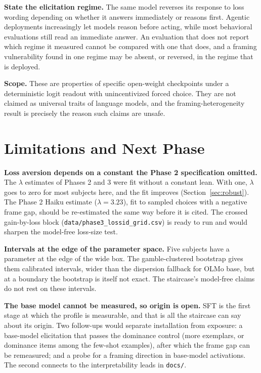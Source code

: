 \documentclass[11pt]{article}
\begin{document}
\textbf{State the elicitation regime.} The same model reverses its response to loss wording depending on
whether it answers immediately or reasons first. Agentic deployments increasingly let models reason
before acting, while most behavioral evaluations still read an immediate answer. An evaluation that does
not report which regime it measured cannot be compared with one that does, and a framing vulnerability
found in one regime may be absent, or reversed, in the regime that is deployed.

\textbf{Scope.} These are properties of specific open-weight checkpoints under a deterministic logit
readout with unincentivized forced choice. They are not claimed as universal traits of language models,
and the framing-heterogeneity result is precisely the reason such claims are unsafe.

\section{Limitations and Next Phase}

\textbf{Loss aversion depends on a constant the Phase 2 specification omitted.} The $\lambda$ estimates
of Phases 2 and 3 were fit without a constant lean. With one, $\lambda$ goes to zero for most subjects
here, and the fit improves (Section~\ref{sec:robust}). The Phase 2 Haiku estimate ($\lambda = 3.23$),
fit to sampled choices with a negative frame gap, should be re-estimated the same way before it is
cited. The crossed gain-by-loss block (\texttt{data/phase3\_lossid\_grid.csv}) is ready to run and would
sharpen the model-free loss-size test.

\textbf{Intervals at the edge of the parameter space.} Five subjects have a parameter at the edge of
the wide box. The gamble-clustered bootstrap gives them calibrated intervals, wider than the dispersion
fallback for OLMo base, but at a boundary the bootstrap is itself not exact. The staircase's
model-free claims do not rest on these intervals.

\textbf{The base model cannot be measured, so origin is open.} SFT is the first stage at which the
profile is measurable, and that is all the staircase can say about its origin. Two follow-ups would
separate installation from exposure: a base-model elicitation that passes the dominance control (more
exemplars, or dominance items among the few-shot examples), after which the frame gap can be remeasured;
and a probe for a framing direction in base-model activations. The second connects to the
interpretability leads in \texttt{docs/}.
\end{document}
